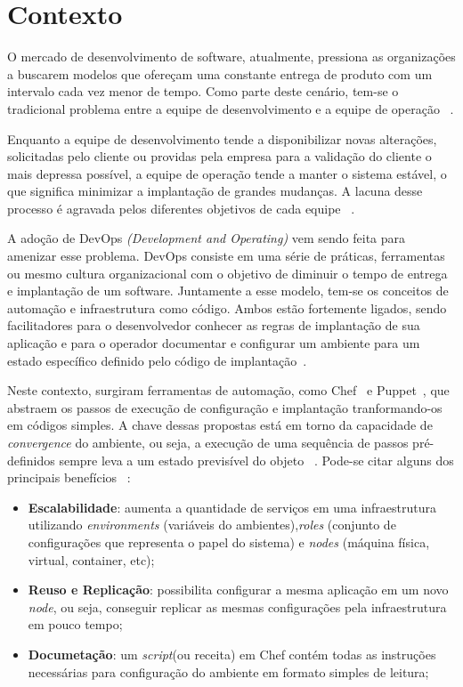 \section{Contexto}
\label{sec:contexto}

O mercado de desenvolvimento de software, atualmente, pressiona as organizações
a buscarem modelos que ofereçam uma constante entrega de produto com
um intervalo cada vez menor de tempo. Como parte deste cenário, tem-se o
tradicional problema entre a equipe de desenvolvimento e a equipe de operação
~\cite{hummer:2013}.

Enquanto a equipe de desenvolvimento tende a disponibilizar novas alterações,
solicitadas pelo cliente ou providas pela empresa para a validação do cliente o
mais depressa possível, a equipe de operação tende a manter o sistema estável,
o que significa minimizar a implantação de grandes mudanças. A lacuna desse
processo é agravada pelos diferentes objetivos de cada equipe
~\cite{huttermann:2012}.

A adoção de DevOps \textit{(Development and Operating)} vem sendo feita
para amenizar esse problema. DevOps consiste em uma série de práticas,
ferramentas ou mesmo cultura organizacional com o objetivo de diminuir o tempo
de entrega e implantação de um software. Juntamente a esse modelo,
tem-se os conceitos de automação e infraestrutura
como código. Ambos estão fortemente ligados, sendo facilitadores para o
desenvolvedor conhecer as regras de implantação de sua aplicação
e para o operador documentar e configurar um ambiente para um estado específico
definido pelo código de implantação~\cite{hummer:2013}.

Neste contexto, surgiram ferramentas de automação, como Chef~\cite{chef:2016} e
Puppet~\cite{puppet:2016}, que abstraem os passos de execução de configuração
e implantação tranformando-os em códigos simples. A chave dessas propostas está em torno
da capacidade de \textit{convergence} do ambiente, ou seja, a execução de uma
sequência de passos pré-definidos sempre leva a um estado previsível do objeto
~\cite{hummer:2013}. Pode-se citar alguns dos principais benefícios
~\cite{vasiliev:2014}:

\begin{itemize}
  \item \textbf{Escalabilidade}: aumenta a quantidade de serviços em uma infraestrutura
    utilizando \textit{environments} (variáveis do ambientes),\textit{roles}
    (conjunto de configurações que representa o papel do sistema) e \textit{nodes}
    (máquina física, virtual, container, etc);
  \item \textbf{Reuso e Replicação}: possibilita configurar a mesma aplicação em um novo \textit{node}, ou seja,
    conseguir replicar as mesmas configurações pela infraestrutura em pouco tempo;
  \item \textbf{Documetação}: um \textit{script}(ou receita) em Chef contém todas as instruções necessárias
    para configuração do ambiente em formato simples de leitura;
\end{itemize}

